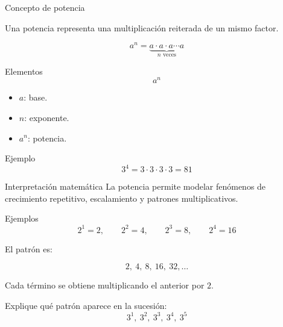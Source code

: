 \documentclass[handout,aspectratio=169]{beamer}
\begin{document}
	\begin{frame}{Concepto de potencia}
		\begin{idea}
			Una potencia representa una multiplicación reiterada de un mismo factor.
		\end{idea}
		
		\[
		a^n = 
		\underbrace{a\cdot a\cdot a\cdots a}_{n\text{ veces}}
		\]
		
		\pause
		
		\begin{block}{Elementos}
			\[
			a^n
			\]
			
			\begin{itemize}
				\item \(a\): base.
				\item \(n\): exponente.
				\item \(a^n\): potencia.
			\end{itemize}
		\end{block}
		
		\pause
		
		\begin{exampleblock}{Ejemplo}
			\[
			3^4 = 3\cdot 3\cdot 3\cdot 3 = 81
			\]
		\end{exampleblock}
	\end{frame}
	
	\begin{frame}{Interpretación matemática}
		La potencia permite modelar fenómenos de crecimiento repetitivo, escalamiento y patrones multiplicativos.
		
		\pause
		
		\begin{block}{Ejemplos}
			\[
			2^1=2,\qquad 2^2=4,\qquad 2^3=8,\qquad 2^4=16
			\]
			
			\pause
			
			El patrón es:
			
			\[
			2,\ 4,\ 8,\ 16,\ 32,\ldots
			\]
			
			Cada término se obtiene multiplicando el anterior por \(2\).
		\end{block}
		
		\pause
		
		\begin{actividad}
			Explique qué patrón aparece en la sucesión:
			\[
			3^1,\ 3^2,\ 3^3,\ 3^4,\ 3^5
			\]
		\end{actividad}
	\end{frame}
	
\end{document}

